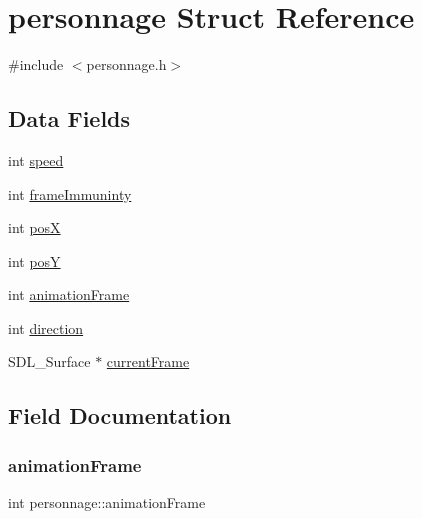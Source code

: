 \hypertarget{structpersonnage}{}\section{personnage Struct Reference}
\label{structpersonnage}


{\ttfamily \#include $<$personnage.\+h$>$}

\subsection*{Data Fields}
\begin{DoxyCompactItemize}
\item 
int \hyperlink{structpersonnage_acb8e0ece93e2c7c15a1672e2867edc19}{speed}
\item 
int \hyperlink{structpersonnage_ab7d66f8290fd0a548b7fe4c521f75e1d}{frame\+Immuninty}
\item 
int \hyperlink{structpersonnage_a6f803343f258e12f2c7127b405ff7ecb}{posX}
\item 
int \hyperlink{structpersonnage_afa542266546b567ffcaa7ead5dd0d3b5}{posY}
\item 
int \hyperlink{structpersonnage_a994136f5b53ed985410bac0afa02749c}{animation\+Frame}
\item 
int \hyperlink{structpersonnage_a2664acffa6fccd8487b9e03b63fbd6da}{direction}
\item 
S\+D\+L\+\_\+\+Surface $\ast$ \hyperlink{structpersonnage_a1b46abccb551fa81f64377bac4626b3a}{current\+Frame}
\end{DoxyCompactItemize}


\subsection{Field Documentation}
\mbox{\label{structpersonnage_a994136f5b53ed985410bac0afa02749c}} 
\subsubsection{\texorpdfstring{animation\+Frame}{animationFrame}}
{\footnotesize\ttfamily int personnage\+::animation\+Frame}

\mbox{\label{structpersonnage_a1b46abccb551fa81f64377bac4626b3a}} 
